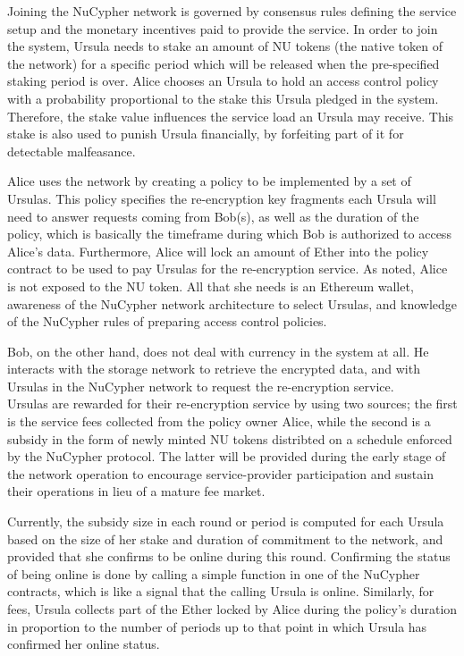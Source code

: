 \documentclass{llncs}
\begin{document}
Joining the NuCypher network is governed by consensus rules defining the service setup
and the monetary incentives paid to provide the service. In order to join the 
system, Ursula needs to stake an amount of NU tokens (the native token of the network) for a specific period
which will be released when the pre-specified staking period is over. Alice chooses an
Ursula to hold an access control policy with a probability proportional to the stake this Ursula 
pledged in the system. Therefore, the stake value influences the service load an Ursula
may receive. This stake is also used to punish Ursula financially, by forfeiting part 
of it for detectable malfeasance. 


Alice uses the network by creating a policy to be implemented by a 
set of Ursulas. This policy specifies the re-encryption key fragments each Ursula will
need to answer requests coming from Bob(s), as well as the duration of the policy, which 
is basically the timeframe during which Bob is authorized to access Alice's data.  Furthermore,
Alice will lock an amount of Ether into the policy contract to be used to pay Ursulas for the re-encryption 
service. As noted, Alice is not exposed to the NU token. All that she needs is an Ethereum
wallet, awareness of the NuCypher network architecture to select Ursulas, and knowledge of the
NuCypher rules of preparing access control policies.


Bob, on the other hand, does not deal with currency in the system at all. He interacts with the storage 
network to retrieve the encrypted data, and with Ursulas in the NuCypher network to request the
re-encryption service. \\


 Ursulas are rewarded for their re-encryption service by using two sources; the first is the service fees collected from the policy owner Alice, while the second is a subsidy in the form of newly minted NU tokens distribted on a schedule enforced by the NuCypher protocol. The latter will be provided during the early stage of the network operation to encourage service-provider participation and sustain their operations in lieu of a mature fee market.


Currently, the subsidy size in each round or period is computed for each Ursula based on the size of her stake and duration of commitment to the network, and provided that she confirms to be online during this round. Confirming the status of being online is done by calling a simple function in one of the NuCypher contracts, which is like a signal that the calling Ursula is online. Similarly, for fees, Ursula collects part of the Ether locked by Alice during the policy's duration in proportion to the number of periods up to that point in which Ursula has confirmed her online status.
\end{document}
